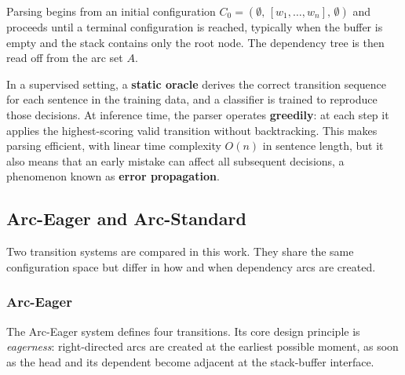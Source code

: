 \documentclass[12pt,letterpaper]{article}
\begin{document}
Parsing begins from an initial configuration $C_0 = (\emptyset,\, [w_1, \ldots, w_n],\, \emptyset)$ and proceeds until a terminal configuration is reached, typically when the buffer is empty and the stack contains only the root node. The dependency tree is then read off from the arc set $A$.

In a supervised setting, a \textbf{static oracle} derives the correct transition sequence for each sentence in the training data, and a classifier is trained to reproduce those decisions. At inference time, the parser operates \textbf{greedily}: at each step it applies the highest-scoring valid transition without backtracking. This makes parsing efficient, with linear time complexity $O(n)$ in sentence length, but it also means that an early mistake can affect all subsequent decisions, a phenomenon known as \textbf{error propagation}.
\subsection{Arc-Eager and Arc-Standard}
\label{subsec:arc_eager_arc_standard}

Two transition systems are compared in this work. They share the same configuration space but differ in how and when dependency arcs are created.

\subsubsection*{Arc-Eager}

The Arc-Eager system \cite{nivre2003efficient} defines four transitions. Its core design principle is \emph{eagerness}: right-directed arcs are created at the earliest possible moment, as soon as the head and its dependent become adjacent at the stack-buffer interface.
\end{document}
